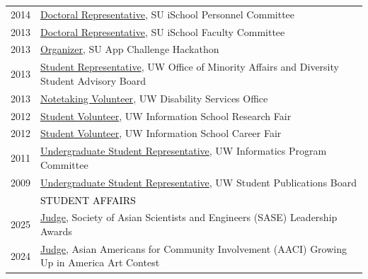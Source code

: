 \documentclass[12pt]{article}
\begin{document}
{\begin{longtable}{R{0.75in}p{5.0in}}
\footnotesize{2014} & \href{https://ischool.syr.edu/}{Doctoral Representative}, SU iSchool Personnel Committee\\

\footnotesize{2013} & \href{https://ischool.syr.edu/}{Doctoral Representative}, SU iSchool Faculty Committee\\

\footnotesize{2013} & \href{https://dailyorange.com/2013/12/su-app-challenge-to-announce-winners-thursday/}{Organizer}, SU App Challenge Hackathon\\

\footnotesize{2013} & \href{https://www.washington.edu/omad/2014/05/09/no-longer-invisible-bryan-dosono/}{Student Representative}, UW Office of Minority Affairs and Diversity Student Advisory Board\\

\footnotesize{2013} & \href{https://depts.washington.edu/uwdrs/current-students/accommodations/notetaking/}{Notetaking Volunteer}, UW Disability Services Office\\

\footnotesize{2012} & \href{https://ischool.uw.edu/current/career-services}{Student Volunteer}, UW Information School Research Fair\\

\footnotesize{2012} & \href{https://web.archive.org/web/20130104065107/https://ischool.uw.edu/news/2012/11/annual-ischool-research-fair-showcases-faculty-and-student-work}{Student Volunteer}, UW Information School Career Fair\\

\footnotesize{2011} & \href{https://ischool.uw.edu/about/leadership}{Undergraduate Student Representative}, UW Informatics Program Committee\\

\footnotesize{2009} & \href{https://en.wikipedia.org/wiki/The_Daily_of_the_University_of_Washington}{Undergraduate Student Representative}, UW Student Publications Board \medskip \\ \pagebreak

& \large \textcolor{black}{\uppercase{Student Affairs}}\\
\footnotesize{2025} & \href{https://main.saseconnect.org/pro/awards}{Judge}, Society of Asian Scientists and Engineers (SASE) Leadership Awards\\

\footnotesize{2024} & \href{https://aaci.org/}{Judge}, Asian Americans for Community Involvement (AACI) Growing Up in America Art Contest\\


\end{longtable}}
\end{document}
